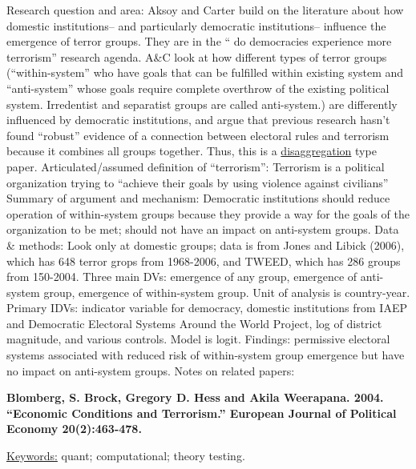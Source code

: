 \documentclass{article}[12pt]
\begin{document}
Research question and area: Aksoy and Carter build on the literature about how domestic institutions-- and particularly democratic institutions-- influence the emergence of terror groups. They are in the `` do democracies experience more terrorism'' research agenda. A\&C look at how different types of terror groups (``within-system'' who have goals that can be fulfilled within existing system and ``anti-system'' whose goals require complete overthrow of the existing political system. Irredentist and separatist groups are called anti-system.) are differently influenced by democratic institutions, and argue that previous research hasn't found ``robust'' evidence of a connection between electoral rules and terrorism because it combines all groups together. Thus, this is a \underline{disaggregation} type paper.
Articulated/assumed definition of ``terrorism'': Terrorism is a political organization trying to ``achieve their goals by using violence against civilians''
Summary of argument and mechanism: Democratic institutions should reduce operation of within-system groups because they provide a way for the goals of the organization to be met; should not have an impact on anti-system groups.
Data \& methods: Look only at domestic groups; data is from Jones and Libick (2006), which has 648 terror grops from 1968-2006, and TWEED, which has 286 groups from 150-2004. Three main DVs: emergence of any group, emergence of anti-system group, emergence of within-system group. Unit of analysis is country-year. Primary IDVs: indicator variable for democracy, domestic institutions from IAEP and Democratic Electoral Systems Around the World Project, log of district magnitude, and various controls. Model is logit.
Findings: permissive electoral systems associated with reduced risk of within-system group emergence but have no impact on anti-system groups. 
Notes on related papers:

\textbf{Blomberg, S. Brock, Gregory D. Hess and Akila Weerapana. 2004. “Economic Conditions and Terrorism.” European Journal of Political Economy 20(2):463-478.}

\underline{Keywords:} quant; computational; theory testing.
\end{document}
